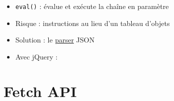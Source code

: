 \begin{itemize}
\tightlist
\item
  \textenglish{\texttt{eval()}} : évalue et exécute la chaîne en
  paramètre
\item
  Risque : instructions au lieu d'un tableau d'objets
\item
  Solution : le
  \href{https://developer.mozilla.org/fr/docs/Web/JavaScript/Reference/Objets_globaux/JSON/parse}{parser}
  JSON
\end{itemize}

\begin{english}

\begin{Shaded}
\begin{Highlighting}[]
\OperatorTok{=} \NormalTok{)}\OperatorTok{;}
\OperatorTok{=} \OperatorTok{;}
\end{Highlighting}
\end{Shaded}

\end{english}

\begin{itemize}
\tightlist
\item
  Avec jQuery :
\end{itemize}

\begin{english}

\begin{Shaded}
\begin{Highlighting}[]
\OperatorTok{=}\NormalTok{(}\NormalTok{)}\OperatorTok{;}
\NormalTok{)}\OperatorTok{;}
\end{Highlighting}
\end{Shaded}

\end{english}

\hypertarget{fetch-api}{%
\section{Fetch API}\label{fetch-api}}

